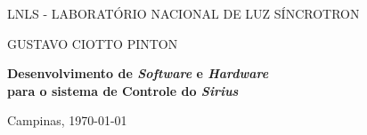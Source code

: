 \begin{center}


\vspace*{12pt}

LNLS - LABORATÓRIO NACIONAL DE LUZ SÍNCROTRON

\vspace*{.30\textheight}

{\Large GUSTAVO CIOTTO PINTON}

\vspace*{72pt}

\textbf{\Large Desenvolvimento de \textit{Software} e \textit{Hardware} \\ para
o sistema de Controle do \textit{Sirius}} \\ \vspace{12pt}

\vspace*{.40\textheight}
 
Campinas, \today

\end{center}

\newpage 
